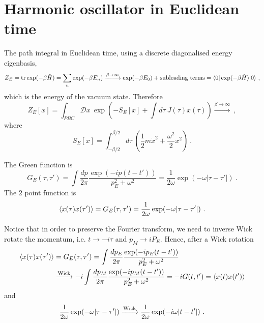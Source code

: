 \section{Harmonic oscillator in Euclidean time}

    The path integral in Euclidean time, using a discrete diagonalised energy eigenbasis, 
    \begin{equation*}
        Z_E = \operatorname{tr} \exp(- \beta \hat H) = \sum_n \exp(- \beta E_n) \xrightarrow{\beta \rightarrow \infty} \exp(- \beta E_0) + \textnormal{subleading terms} = \langle0\vert \exp(-\beta \hat H) \vert0\rangle ~,
    \end{equation*}
    which is the energy of the vacuum state. Therefore 
    \begin{equation*}
        Z_E [x] = \int_{PBC} \mathcal D x ~ \exp(- S_E[x] + \int d\tau ~ J(\tau) x(\tau)) \xrightarrow{\beta \rightarrow \infty} ~,
    \end{equation*}
    where 
    \begin{equation*}
        S_E[x] = \int_{-\beta/2}^{\beta/2} d\tau ~ ( \frac{1}{2} m \dot x^2 + \frac{\omega^2}{2} x^2)~.
    \end{equation*}

    The Green function is 
    \begin{equation*}
        G_E (\tau, \tau') = \int \frac{dp}{2\pi} \frac{\exp(- i p (t - t'))}{p_E^2 + \omega^2} = \frac{1}{2\omega} \exp(- \omega |\tau - \tau'|) ~.
    \end{equation*}
    The $2$ point function is 
    \begin{equation*}
        \langle x(\tau) x(\tau')\rangle = G_E(\tau, \tau') = \frac{1}{2\omega} \exp(- \omega |\tau - \tau'|) ~.
    \end{equation*}

    Notice that in order to preserve the Fourier transform, we need to inverse Wick rotate the momentum, i.e. $t \rightarrow - i \tau$ and $p_M \rightarrow i P_E$. Hence, after a Wick rotation 
    \begin{equation*}
    \begin{aligned}
        \langle x(\tau) x(\tau')\rangle & = G_E(\tau, \tau') = \int \frac{dp_E}{2\pi} \frac{\exp(- i p_E (t - t'))}{p_E^2 + \omega^2} \\ & \xrightarrow{\textnormal{Wick}} - i \int \frac{dp_M}{2\pi} \frac{\exp(- i p_M (t - t'))}{p_E^2 + \omega^2} = - i G(t,t') = \langle x(t) x(t')\rangle
    \end{aligned}
    \end{equation*}
    and 
    \begin{equation*}
        \frac{1}{2\omega} \exp(- \omega |\tau - \tau'|) \xrightarrow{\textnormal{Wick}} \frac{1}{2\omega} \exp(- i \omega |t - t'|) ~.
    \end{equation*}

